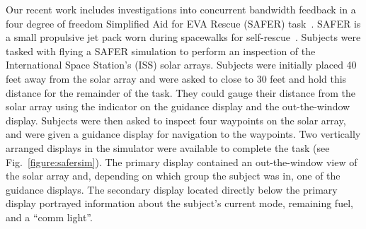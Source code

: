 Our recent work includes investigations into concurrent bandwidth feedback in a four degree of freedom Simplified Aid for EVA Rescue (SAFER) task~\citep{karasinski_real-time_2016, karasinski_real-time_2017, karasinski_development_2016}.
SAFER is a small propulsive jet pack worn during spacewalks for self-rescue~\citep{Vassigh1998}.
Subjects were tasked with flying a SAFER simulation to perform an inspection of the International Space Station's (ISS) solar arrays.
Subjects were initially placed 40 feet away from the solar array and were asked to close to 30 feet and hold this distance for the remainder of the task.
They could gauge their distance from the solar array using the indicator on the guidance display and the out-the-window display.
Subjects were then asked to inspect four waypoints on the solar array, and were given a guidance display for navigation to the waypoints.
Two vertically arranged displays in the simulator were available to complete the task (see Fig.~\ref{figure:safersim}).
The primary display contained an out-the-window view of the solar array and, depending on which group the subject was in, one of the guidance displays.
The secondary display located directly below the primary display portrayed information about the subject's current mode, remaining fuel, and a ``comm light''.

